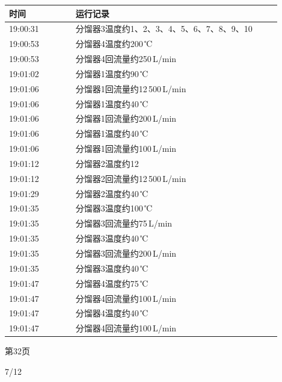 \documentclass[UTF8,10pt,a4paper,fontset=fandol]{ctexart}
\newcommand{\handwritten}[1]{#1}
\begin{document}
\begin{center}
\begin{minipage}[t]{0.46\linewidth}
\medskip
\begin{tabular}{|p{0.22\linewidth}|p{0.68\linewidth}|}
\hline
时间 & 运行记录 \\ \hline
19:00:31 & 分馏器3温度约1、2、3、4、5、6、7、8、9、10 \\ \hline
19:00:53 & 分馏器4温度约200\,℃ \\ \hline
19:00:53 & 分馏器4回流量约250\,L/min \\ \hline
19:01:02 & 分馏器1温度约90\,℃ \\ \hline
19:01:06 & 分馏器1回流量约12\,500\,L/min \\ \hline
19:01:06 & 分馏器1温度约40\,℃ \\ \hline
19:01:06 & 分馏器1回流量约200\,L/min \\ \hline
19:01:06 & 分馏器1温度约40\,℃ \\ \hline
19:01:06 & 分馏器1回流量约100\,L/min \\ \hline
19:01:12 & 分馏器2温度约12 \\ \hline
19:01:12 & 分馏器2回流量约12\,500\,L/min \\ \hline
19:01:29 & 分馏器2温度约40\,℃ \\ \hline
19:01:35 & 分馏器3温度约100\,℃ \\ \hline
19:01:35 & 分馏器3回流量约75\,L/min \\ \hline
19:01:35 & 分馏器3温度约40\,℃ \\ \hline
19:01:35 & 分馏器3回流量约200\,L/min \\ \hline
19:01:35 & 分馏器3温度约40\,℃ \\ \hline
19:01:47 & 分馏器4温度约75\,℃ \\ \hline
19:01:47 & 分馏器4回流量约100\,L/min \\ \hline
19:01:47 & 分馏器4温度约40\,℃ \\ \hline
19:01:47 & 分馏器4回流量约100\,L/min \\ \hline
\end{tabular}

\smallskip
第32页
\end{minipage}
\end{center}

\handwritten{7/12}

\newpage
\end{document}
